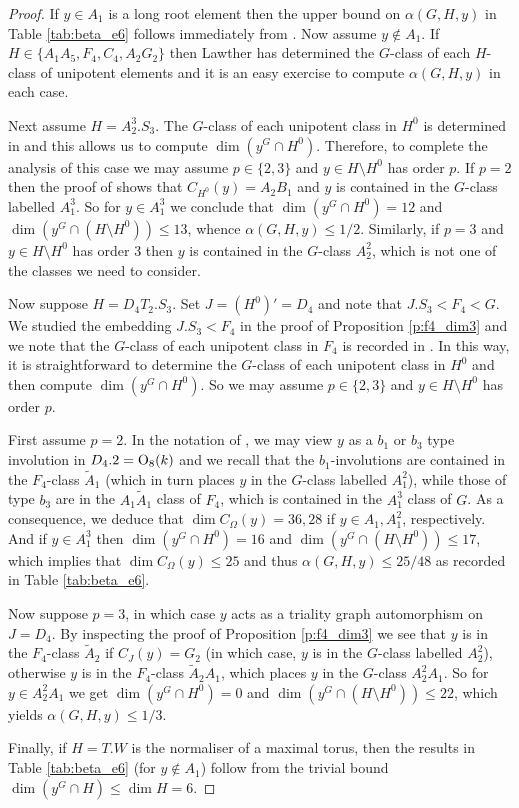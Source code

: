 \documentclass[twoside,a4paper,reqno,11pt]{amsart}
\renewcommand{\a}{\alpha}
\renewcommand{\O}{\Omega}
\newcommand{\<}{\langle}
\renewcommand{\>}{\rangle}
\newcommand{\leqs}{\leqslant}
\renewcommand{\:}{\colon}
\theoremstyle{plain}
\theoremstyle{definition}
\begin{document}
\begin{proof}
If $y \in A_1$ is a long root element then the upper bound on $\a(G,H,y)$ in Table \ref{tab:beta_e6} follows immediately from \cite[Theorem 3.1]{BGG1}. Now assume $y \not\in A_1$. If $H \in \{A_1A_5, F_4, C_4, A_2G_2\}$ then Lawther \cite{Law2} has determined the $G$-class of each $H$-class of unipotent elements and it is an easy exercise to compute $\a(G,H,y)$ in each case.

Next assume $H = A_2^3.S_3$. The $G$-class of each unipotent class in $H^0$ is determined in \cite[Section 4.9]{Law2} and this allows us to compute $\dim(y^G \cap H^0)$. Therefore, to complete the analysis of this case we may assume $p \in \{2,3\}$ and $y \in H \setminus H^0$ has order $p$. If $p=2$ then the proof of \cite[Lemma 4.12]{BTh0} shows that $C_{H^0}(y) = A_2B_1$ and $y$ is contained in the $G$-class labelled $A_1^3$. So for $y \in A_1^3$ we conclude that $\dim(y^G \cap H^0) = 12$ and 
$\dim(y^G \cap (H \setminus H^0)) \leqs 13$, whence $\a(G,H,y) \leqs 1/2$. Similarly, if $p=3$ and $y \in H \setminus H^0$ has order $3$ then $y$ is contained in the $G$-class $A_2^2$, which is not one of the classes we need to consider.

Now suppose $H = D_4T_2.S_3$.  Set $J = (H^0)' = D_4$ and note that $J.S_3 < F_4 < G$. We studied the embedding $J.S_3 < F_4$ in the proof of Proposition \ref{p:f4_dim3} and we note that the $G$-class of each unipotent class in $F_4$ is recorded in  \cite[Table 22.1.4]{LS_book}. In this way, it is straightforward to determine the $G$-class of each unipotent class in $H^0$ and then compute $\dim(y^G \cap H^0)$.
So we may assume $p \in \{2,3\}$ and $y \in H \setminus H^0$ has order $p$.

First assume $p=2$. In the notation of \cite{AS}, we may view $y$ as a $b_1$ or $b_3$ type involution in $D_4.2 = {\rm O}_8(k)$ and we recall that the $b_1$-involutions are contained in the $F_4$-class $\tilde{A}_1$ (which in turn places $y$ in the $G$-class labelled $A_1^2$), while those of type $b_3$ are in the $A_1\tilde{A}_1$ class of $F_4$, which is contained in the $A_1^3$ class of $G$. As a consequence, we deduce that $\dim C_{\O}(y) = 36, 28$ if $y \in A_1, A_1^2$, respectively. And if $y \in A_1^3$ then $\dim(y^G \cap H^0) = 16$ and $\dim(y^G \cap (H \setminus H^0)) \leqs 17$, which implies that $\dim C_{\O}(y) \leqs 25$ and thus $\a(G,H,y) \leqs 25/48$ as recorded in Table \ref{tab:beta_e6}.

Now suppose $p=3$, in which case $y$ acts as a triality graph automorphism on $J = D_4$. By inspecting the proof of Proposition \ref{p:f4_dim3} we see that $y$ is in the $F_4$-class $\tilde{A}_2$ if $C_J(y) = G_2$ (in which case, $y$ is in the $G$-class labelled $A_2^2$), otherwise $y$ is in the $F_4$-class $\tilde{A}_2A_1$, which places $y$ in the $G$-class $A_2^2A_1$. So for $y \in A_2^2A_1$ we get $\dim(y^G \cap H^0) = 0$ and $\dim(y^G \cap (H \setminus H^0)) \leqs 22$, which yields $\a(G,H,y) \leqs 1/3$. 

Finally, if $H = T.W$ is the normaliser of a maximal torus, then the results in Table \ref{tab:beta_e6} (for $y \not\in A_1$) follow from the trivial bound $\dim(y^G \cap H) \leqs \dim H = 6$.
\end{proof}
\end{document}
